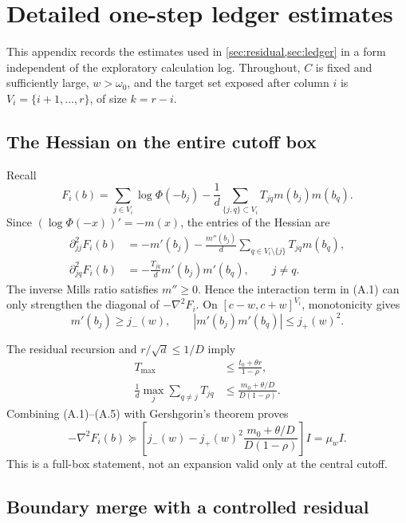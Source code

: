 \section{Detailed one-step ledger estimates}\label{app:one-step}

This appendix records the estimates used in \cref{sec:residual,sec:ledger} in
a form independent of the exploratory calculation log.  Throughout, $C$ is
fixed and sufficiently large, $w>\omega_0$, and the target set exposed after
column $i$ is $V_i=\{i+1,\ldots,r\}$, of size $k=r-i$.

\subsection{The Hessian on the entire cutoff box}

Recall
\[
 F_i(b)=\sum_{j\in V_i}\log\Phi(-b_j)
 -\frac1d\sum_{\{j,q\}\subset V_i}T_{jq}m(b_j)m(b_q).
\]
Since $(\log\Phi(-x))'=-m(x)$, the entries of the Hessian are
\begin{align}
 \partial_{jj}^2F_i(b)
 &=-m'(b_j)-\frac{m''(b_j)}d
   \sum_{q\in V_i\setminus\{j\}}T_{jq}m(b_q), \tag{A.1}\\
 \partial_{jq}^2F_i(b)
 &=-\frac{T_{jq}}d m'(b_j)m'(b_q),\qquad j\ne q. \tag{A.2}
\end{align}
The inverse Mills ratio satisfies $m''\ge0$.  Hence the interaction term in
(A.1) can only strengthen the diagonal of $-\nabla^2F_i$.  On
$[c-w,c+w]^{V_i}$, monotonicity gives
\[
 m'(b_j)\ge j_-(w),\qquad |m'(b_j)m'(b_q)|\le j_+(w)^2.
\tag{A.3}
\]

The residual recursion and $r/\sqrt d\le1/D$ imply
\begin{align}
 T_{\max}&\le \frac{t_0+\theta r}{1-\rho}, \tag{A.4}\\
 \frac1d\max_j\sum_{q\ne j}T_{jq}
 &\le \frac{m_0+\theta/D}{D(1-\rho)}. \tag{A.5}
\end{align}
Combining (A.1)--(A.5) with Gershgorin's theorem proves
\[
 -\nabla^2F_i(b)\succeq
 \left[j_-(w)-j_+(w)^2
 \frac{m_0+\theta/D}{D(1-\rho)}\right]I
 =\mu_w I. \tag{A.6}
\]
This is a full-box statement, not an expansion valid only at the central
cutoff.

\subsection{Boundary merge with a controlled residual}

